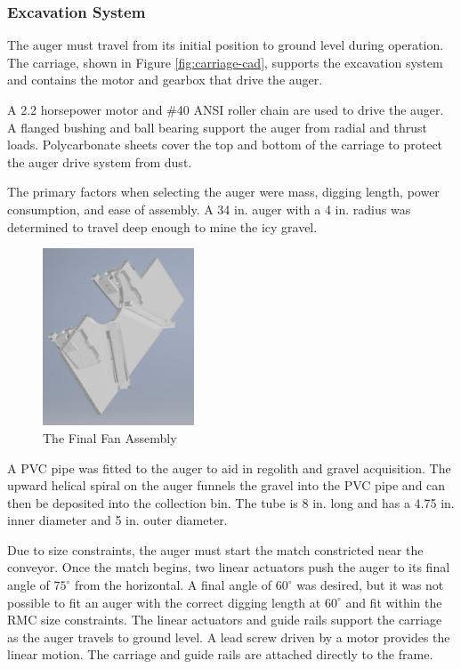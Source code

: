 \documentclass[class=article, crop=false]{standalone}
\begin{document}
	
	\subsubsection{Excavation System}
	
	The auger must travel from its initial position to ground level during operation. The carriage, shown in Figure \ref{fig:carriage-cad}, supports the excavation system and contains the motor and gearbox that drive the auger. 
	
	A 2.2 horsepower motor and \#40 ANSI roller chain are used to drive the auger.  A flanged bushing and ball bearing support the auger from radial and thrust loads. Polycarbonate sheets cover the top and bottom of the carriage to protect the auger drive system from dust.
	
	The primary factors when selecting the auger were mass, digging length, power consumption, and ease of assembly. A 34 in. auger with a 4 in. radius was determined to travel deep enough to mine the icy gravel. 
	
	\begin{figure}
	\centering
	 \includegraphics[width=0.4\textwidth]{09_Figures/fan-cad.jpg}
	 \caption{The Final Fan Assembly}
	 \label{fig:fan-cad}
	\end{figure}
	
	A PVC pipe was fitted to the auger to aid in regolith and gravel acquisition. The upward helical spiral on the auger funnels the gravel into the PVC pipe and can then be deposited into the collection bin. The tube is 8 in. long and has a 4.75 in. inner diameter and 5 in. outer diameter. 
	
	Due to size constraints, the auger must start the match constricted near the conveyor. Once the match begins, two linear actuators push the auger to its final angle of $75^\circ$ from the horizontal. A final angle of $60^{\circ}$ was desired, but it was not possible to fit an auger with the correct digging length at $60^\circ$ and fit within the RMC size constraints. The linear actuators and guide rails support the carriage as the auger travels to ground level. A lead screw driven by a motor provides the linear motion. The carriage and guide rails are attached directly to the frame.
	
\end{document}
